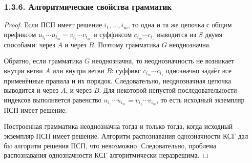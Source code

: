 \documentclass[mathserif,12pt,aspectratio=169]{beamer}
\begin{document}
\begin{frame}[t]
	\frametitle{1.3.6. Алгоритмические свойства грамматик }
	\setlength{\parskip}{1pt}
	\sloppy
	
	\begin{proof}
		\par\vspace{-4pt}
		Если ПСП имеет решение $i_1,\ldots,i_m$, то одна и та же цепочка с общим префиксом $u_{i_1}\cdots u_{i_m}=v_{i_1}\cdots v_{i_m}$ и суффиксом $c_{i_m}\cdots c_{i_1}$ выводится из $S$ двумя способами: через $A$ и через $B$. Поэтому грамматика $G$ неоднозначна.
		
		Обратно, если грамматика $G$ неоднозначна, то неоднозначность не возникает внутри ветви $A$ или внутри ветви $B$: суффикс $c_{i_m}\cdots c_{i_1}$ однозначно задаёт все применённые правила и их порядок. Следовательно, неоднозначная цепочка выводится и через $A$, и через $B$. Для некоторой непустой последовательности индексов выполняется равенство $u_{i_1}\cdots u_{i_m}=v_{i_1}\cdots v_{i_m}$, то есть исходный экземпляр ПСП имеет решение.
		
		Построенная грамматика неоднозначна тогда и только тогда, когда исходный экземпляр ПСП имеет решение. Алгоритм распознавания однозначности КСГ дал бы алгоритм решения ПСП, что невозможно. Следовательно, проблема распознавания однозначности КСГ алгоритмически неразрешима.
	\end{proof}
	
\end{frame}
\end{document}
